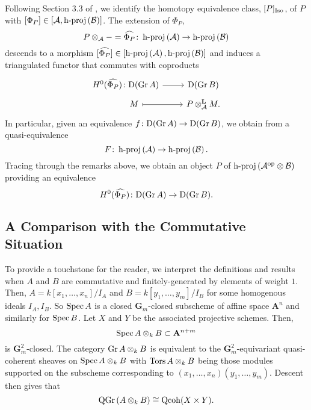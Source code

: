 Following Section 3.3 of \parencite{CS15}, we identify the homotopy equivalence class, \([P]_{\operatorname{Iso}}\), of \(P\) with \([\Phi_P] \in [\mathcal{A}, \operatorname{h-proj}\left(\mathcal{B}\right)]\).
The extension of \(\Phi_P\),
\[P \otimes_{\mathcal{A}} - = \widehat{\Phi_P} \colon \operatorname{h-proj}\left(\mathcal{A}\right) \to \operatorname{h-proj}\left(\mathcal{B}\right)\]
descends to a morphism \([\widehat{\Phi_P}] \in [\operatorname{h-proj}\left(\mathcal{A}\right), \operatorname{h-proj}\left(\mathcal{B}\right)]\)
and induces a triangulated functor that commutes with coproducts
\[\begin{tikzcd}[row sep=tiny]
H^0(\widehat{\Phi_P}) \colon \mathrm{D}(\Gr{A}) \arrow{r} & \mathrm{D}(\Gr{B})\\
\quad\quad M \arrow[mapsto]{r} & P \otimes_\A^\mathbf{L} M.
\end{tikzcd}\]
In particular, given an equivalence \(f \colon \mathrm{D}(\operatorname{Gr}A) \to \mathrm{D}(\operatorname{Gr}B)\), we obtain from \parencite{Lunts-Orlov} a quasi-equivalence
\[F \colon \operatorname{h-proj}\left(\mathcal{A}\right) \to \operatorname{h-proj}\left(\mathcal{B}\right).\]
Tracing through the remarks above, we obtain an object \(P\) of \(\operatorname{h-proj}\left(\mathcal{A}^{\operatorname{op}} \otimes \mathcal{B}\right)\) providing an equivalence
\[H^0(\widehat{\Phi_P}) \colon \mathrm{D}(\operatorname{Gr}A) \to \mathrm{D}(\operatorname{Gr}B).\]

\subsection{A Comparison with the Commutative Situation}

To provide a touchstone for the reader, we interpret the definitions and results when \(A\) and \(B\) are commutative and finitely-generated by elements of weight \(1\). Then, \(A = k[x_1,\ldots,x_n]/I_A\) and \(B = k[y_1,\ldots,y_m]/I_B\) for some homogenous ideals \(I_A,I_B\). So \(\operatorname{Spec} A\) is a closed \(\mathbf{G}_m\)-closed subscheme of affine space \(\mathbf{A}^n\) and similarly for \(\operatorname{Spec} B\). Let \(X\) and \(Y\) be the associated projective schemes. Then, 
\begin{displaymath}
  \operatorname{Spec} A \otimes_k B \subset \mathbf{A}^{n+m}
\end{displaymath}
is \(\mathbf{G}_m^2\)-closed. The category \(\operatorname{Gr}A \otimes_k B\) is equivalent to the \(\mathbf{G}_m^2\)-equivariant quasi-coherent sheaves on \(\operatorname{Spec} A \otimes_k B\) with \(\operatorname{Tors}A \otimes_k B\) being those modules supported on the subscheme corresponding to \((x_1,\ldots,x_n)(y_1,\ldots,y_m)\). Descent then gives that 
\begin{displaymath}
  \operatorname{QGr}\left(A \otimes_k B\right) \cong \operatorname{Qcoh}(X \times Y). 
\end{displaymath}
